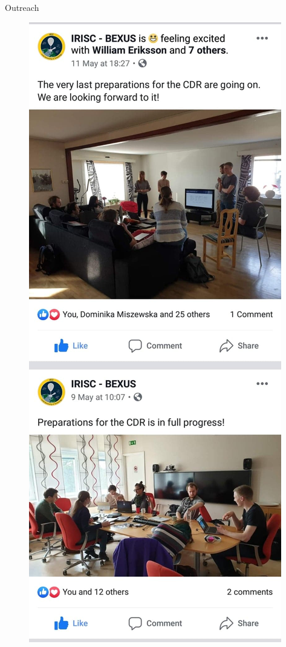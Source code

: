 \documentclass[11pt, aspectratio=169]{beamer}
\begin{document}
\begin{frame}[c]{Outreach}
\begin{minipage}[c]{0.30\linewidth}
\begin{figure}[]
            \includegraphics[height=0.9\textheight]{images/facebook.jpg}
            \label{}
        \end{figure}
    \end{minipage}

\end{frame}
\end{document}
